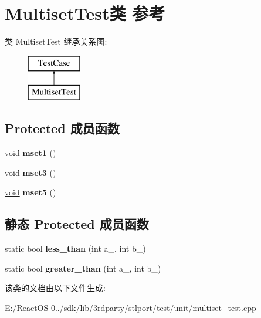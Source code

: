 \hypertarget{class_multiset_test}{}\section{Multiset\+Test类 参考}
\label{class_multiset_test}
类 Multiset\+Test 继承关系图\+:\begin{figure}[H]
\begin{center}
\leavevmode
\includegraphics[height=2.000000cm]{class_multiset_test}
\end{center}
\end{figure}
\subsection*{Protected 成员函数}
\begin{DoxyCompactItemize}
\item 
\mbox{\label{class_multiset_test_a262713f66ede3749508adcd02b2f7314}} 
\hyperlink{interfacevoid}{void} {\bfseries mset1} ()
\item 
\mbox{\label{class_multiset_test_a4073857fb572fa7e4c78bf4b079d7aa4}} 
\hyperlink{interfacevoid}{void} {\bfseries mset3} ()
\item 
\mbox{\label{class_multiset_test_ac0d00440765afb4abb4b43d46d4903e7}} 
\hyperlink{interfacevoid}{void} {\bfseries mset5} ()
\end{DoxyCompactItemize}
\subsection*{静态 Protected 成员函数}
\begin{DoxyCompactItemize}
\item 
\mbox{\label{class_multiset_test_a4b7c07149104908bc0e17d5b216c3091}} 
static bool {\bfseries less\+\_\+than} (int a\+\_\+, int b\+\_\+)
\item 
\mbox{\label{class_multiset_test_aef47fd58dedcff025a002d2cefee461b}} 
static bool {\bfseries greater\+\_\+than} (int a\+\_\+, int b\+\_\+)
\end{DoxyCompactItemize}


该类的文档由以下文件生成\+:\begin{DoxyCompactItemize}
\item 
E\+:/\+React\+O\+S-\/0../sdk/lib/3rdparty/stlport/test/unit/multiset\+\_\+test.\+cpp\end{DoxyCompactItemize}
